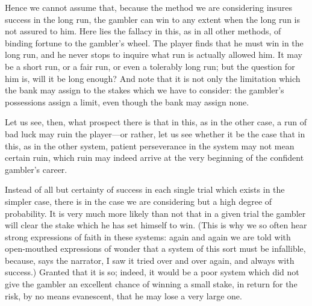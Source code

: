 \documentclass[letterpaper,12pt,oneside,openany]{memoir}
\begin{document}
Hence we cannot assume that, because the method
we are considering insures success in the long run, the
gambler can win to any extent when the long run is
not assured to him. Here lies the fallacy in this, as in
all other methods, of binding fortune to the gambler's
wheel. The player finds that he must win in the long
run, and he never stops to inquire what run is actually
allowed him. It may be a short run, or a fair run, or
even a tolerably long run; but the question for him is,
will it be long enough? And note that it is not only
the limitation which the bank may assign to the
stakes which we have to consider: the gambler's possessions
assign a limit, even though the bank may assign
none.

Let us see, then, what prospect there is that in this,
as in the other case, a run of bad luck may ruin the player---or
rather, let us see whether it be the case that in
this, as in the other system, patient perseverance in
the system may not mean certain ruin, which ruin may
indeed arrive at the very beginning of the confident
gambler's career.

Instead of all but certainty of success in each single
trial which exists in the simpler case, there is in the
case we are considering but a high degree of probability.
It is very much more likely than not that in a
given trial the gambler will clear the stake which he
has set himself to win. (This is why we so often hear
strong expressions of faith in these systems: again and
again we are told with open-mouthed expressions of
wonder that a system of this sort must be infallible,
because, says the narrator, I saw it tried over and over
again, and always with success.) Granted that it is so;
indeed, it would be a poor system which did not give
the gambler an excellent chance of winning a small
stake, in return for the risk, by no means evanescent,
that he may lose a very large one.
\end{document}
